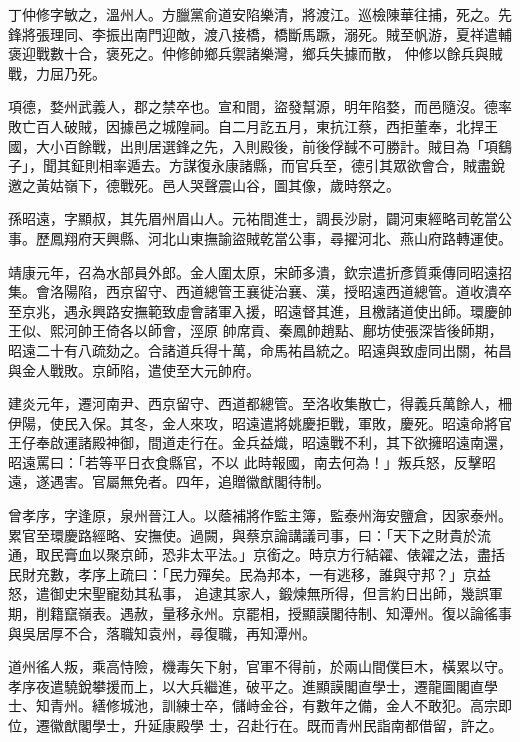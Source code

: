 \begin{pinyinscope}
 丁仲修字敏之，溫州人。方臘黨俞道安陷樂清，將渡江。巡檢陳華往捕，死之。先鋒將張理同、李振出南門迎敵，渡八接橋，橋斷馬蹶，溺死。賊至帆游，夏祥遣輔褒迎戰數十合，褒死之。仲修帥鄉兵禦諸樂灣，鄉兵失據而散，
 仲修以餘兵與賊戰，力屈乃死。



 項德，婺州武義人，郡之禁卒也。宣和間，盜發幫源，明年陷婺，而邑隨沒。德率敗亡百人破賊，因據邑之城隍祠。自二月訖五月，東抗江蔡，西拒董奉，北捍王國，大小百餘戰，出則居選鋒之先，入則殿後，前後俘馘不可勝計。賊目為「項鷂子」，聞其鉦則相率遁去。方謀復永康諸縣，而官兵至，德引其眾欲會合，賊盡銳邀之黃姑嶺下，德戰死。邑人哭聲震山谷，圖其像，歲時祭之。



 孫昭遠，字顯叔，其先眉州眉山人。元祐間進士，調長沙尉，闢河東經略司乾當公事。歷鳳翔府天興縣、河北山東撫諭盜賊乾當公事，尋擢河北、燕山府路轉運使。



 靖康元年，召為水部員外郎。金人圍太原，宋師多潰，欽宗遣折彥質乘傳同昭遠招集。會洛陽陷，西京留守、西道總管王襄徙治襄、漢，授昭遠西道總管。道收潰卒至京兆，遇永興路安撫範致虛會諸軍入援，昭遠督其進，且檄諸道使出師。環慶帥王似、熙河帥王倚各以師會，涇原
 帥席貢、秦鳳帥趙點、鄜坊使張深皆後師期，昭遠二十有八疏劾之。合諸道兵得十萬，命馬祐昌統之。昭遠與致虛同出關，祐昌與金人戰敗。京師陷，遣使至大元帥府。



 建炎元年，遷河南尹、西京留守、西道都總管。至洛收集散亡，得義兵萬餘人，柵伊陽，使民入保。其冬，金人來攻，昭遠遣將姚慶拒戰，軍敗，慶死。昭遠命將官王仔奉啟運諸殿神御，間道走行在。金兵益熾，昭遠戰不利，其下欲擁昭遠南還，昭遠罵曰：「若等平日衣食縣官，不以
 此時報國，南去何為！」叛兵怒，反擊昭遠，遂遇害。官屬無免者。四年，追贈徽猷閣待制。



 曾孝序，字逢原，泉州晉江人。以蔭補將作監主簿，監泰州海安鹽倉，因家泰州。累官至環慶路經略、安撫使。過闕，與蔡京論講議司事，曰：「天下之財貴於流通，取民膏血以聚京師，恐非太平法。」京銜之。時京方行結糴、俵糴之法，盡括民財充數，孝序上疏曰：「民力殫矣。民為邦本，一有逃移，誰與守邦？」京益怒，遣御史宋聖寵劾其私事，
 追逮其家人，鍛煉無所得，但言約日出師，幾誤軍期，削籍竄嶺表。遇赦，量移永州。京罷相，授顯謨閣待制、知潭州。復以論徭事與吳居厚不合，落職知袁州，尋復職，再知潭州。



 道州徭人叛，乘高恃險，機毒矢下射，官軍不得前，於兩山間僕巨木，橫累以守。孝序夜遣驍銳攀援而上，以大兵繼進，破平之。進顯謨閣直學士，遷龍圖閣直學士、知青州。繕修城池，訓練士卒，儲峙金谷，有數年之備，金人不敢犯。高宗即位，遷徽猷閣學士，升延康殿學
 士，召赴行在。既而青州民詣南都借留，許之。




\end{pinyinscope}
